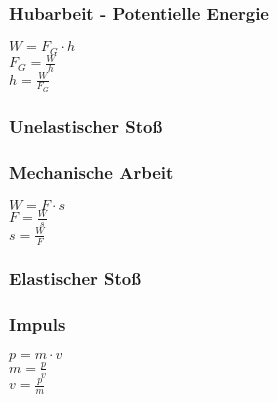 \subsubsection{Hubarbeit - Potentielle Energie} 
\begin{minipage}{0.45\textwidth} 
$ W = F_{G} \cdot h $\\ 
$ F_{G}  = \frac{W}{h} $\\ 
$ h = \frac{W}{F_{G} } $\\ 
\end{minipage} 
\begin{minipage}{0.45\textwidth} 
 
\end{minipage} 
\subsubsection{Unelastischer Stoß} 
\begin{minipage}{0.45\textwidth} 
\end{minipage} 
\begin{minipage}{0.45\textwidth} 
 
\end{minipage} 
\subsubsection{Mechanische Arbeit} 
\begin{minipage}{0.45\textwidth} 
$ W = F\cdot s $\\ 
$ F = \frac{W}{s} $\\ 
$ s = \frac{W}{F} $\\ 
\end{minipage} 
\begin{minipage}{0.45\textwidth} 
 
\end{minipage} 
\subsubsection{Elastischer Stoß} 
\begin{minipage}{0.45\textwidth} 
\end{minipage} 
\begin{minipage}{0.45\textwidth} 
 
\end{minipage} 
\subsubsection{Impuls} 
\begin{minipage}{0.45\textwidth} 
$ p = m\cdot v $\\ 
$ m = \frac{p}{v} $\\ 
$ v = \frac{p}{m} $\\ 
\end{minipage} 
\begin{minipage}{0.45\textwidth} 
 
\end{minipage} 
